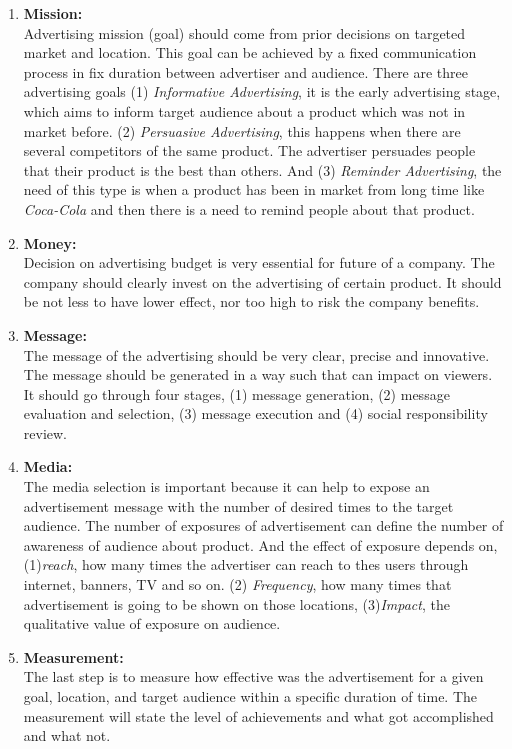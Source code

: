 \begin{enumerate}

\item \textbf{Mission:} \\
Advertising mission (goal) should come from prior decisions on targeted market and location. This goal can be achieved by a fixed communication process in fix duration between advertiser and audience. There are three advertising goals (1) \emph{Informative Advertising}, it is the early advertising stage, which aims to inform target audience about a product which was not in market before. (2) \emph{Persuasive Advertising}, this happens when there are several competitors of the same product. The advertiser persuades people that their product is the best than others. And (3) \emph{Reminder Advertising}, the need of this type is when a product has been in market from long time like \emph{Coca-Cola} and then there is a need to remind people about that product.

\item \textbf{Money:} \\
Decision on advertising budget is very essential for future of a company. The company should clearly invest on the advertising of certain product. It should be not less to have lower effect, nor too high to risk the company benefits. 

\item \textbf{Message:} \\
The message of the advertising should be very clear, precise and innovative. The message should be generated in a way such that can impact on viewers. It should go through four stages, (1) message generation, (2) message evaluation and selection, (3) message execution and (4) social responsibility review.

\item \textbf{Media:} \\
The media selection is important because it can help to expose an advertisement message with the number of desired times to the target audience. The number of exposures of advertisement can define the number of awareness of audience about product. And the effect of exposure depends on, (1)\emph{reach}, how many times the advertiser can reach to thes users through internet, banners, TV and so on. (2) \emph{Frequency}, how many times that advertisement is going to be shown on those locations, (3)\emph{Impact}, the qualitative value of exposure on audience.

\item \textbf{Measurement:} \\
The last step is to measure how effective was the advertisement for a given goal, location, and target audience within a specific duration of time. The measurement will state the level of achievements and what got accomplished and what not.
\end{enumerate}



